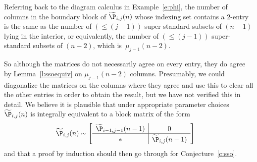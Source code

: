 Referring back to the diagram calculus in Example~\ref{e:phi}, the number of columns in the boundary block of $\widetilde\P_{i,j}(n)$ whose indexing set contains a $2$-entry is the same as the number of $(\leq (j-1))$ super-standard subsets of $(n-1)$ lying in the interior, or equivalently, the number of $(\leq (j-1))$ super-standard subsets of $(n-2)$, which is~$\mu_{j-1}(n-2)$.

So although the matrices do not necessarily agree on every entry, they do agree by Lemma~\ref{l:ssoequiv} on $\mu_{j-1}(n-2)$ columns.  Presumably, we could diagonalize the matrices on the columns where they agree and use this to clear all the other entries in order to obtain the result, but we have not verified this in detail.  We believe it is plausible that under appropriate parameter choices $\widetilde\P_{i,j}(n)$ is integrally equivalent to a block matrix of the form
\newcommand\Tstrut{\rule{0pt}{2.6ex}}         
\newcommand\Bstrut{\rule[-0.9ex]{0pt}{0pt}}  
\begin{align*}
\widetilde{\P}_{i,j}(n) &\sim \left [ \begin{array}{c|c}
\widetilde{\P}_{i-1,j-1}(n-1) & 0 \Tstrut\Bstrut \\
\hline
\ast & \widetilde{\P}_{i,j}(n-1) \Tstrut\Bstrut 
\end{array} \right ]
\end{align*}
and that a proof by induction should then go through for Conjecture~\ref{c:sso}.

